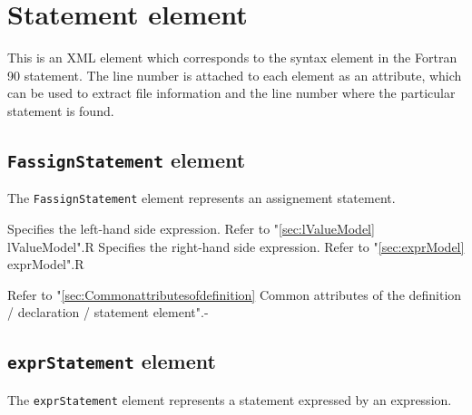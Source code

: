 \section{Statement element}

This is an XML element which corresponds to the syntax element in the Fortran 90 statement.
The line number is attached to each element as an attribute, which can be used to extract file information and the line number where the particular statement is found.

\subsection{ {\tt FassignStatement} element}

The {\tt FassignStatement} element represents an assignement statement.


\begin{XcodeMLChildElements}
{Specifies the left-hand side expression. Refer to "\ref{sec:lValueModel} lValueModel".}{R}
{Specifies the right-hand side expression. Refer to "\ref{sec:exprModel} exprModel".}{R}
\end{XcodeMLChildElements}

\begin{XcodeMLAttributes}
{Refer to "\ref{sec:Commonattributesofdefinition} Common attributes of the definition / declaration / statement element".}{-}
\end{XcodeMLAttributes}


\subsection{ {\tt exprStatement} element}

The {\tt exprStatement} element represents a statement expressed by an expression.


